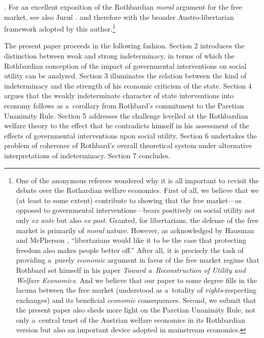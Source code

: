 {%
\parencites*[][]{rothbard_for_2006}[][]{rothbard_man_2009}[][]{rothbard_ethics_2002}. %
 For an excellent exposition of the Rothbardian \textit{moral} argument for the free market, see also Juruś 
\parencite*[][]{jurus_w_2012}. %
 } and therefore with the broader Austro-libertarian framework adopted by this author.\footnote{One of the anonymous referees wondered why it is all important to revisit the debate over the Rothardian welfare economics. First of all, we believe that we (at least to some extent) contribute to showing that the free market---as opposed to governmental interventions---bears positively on social utility not only \textit{ex ante} but also \textit{ex post}. Granted, for libertarians, the defense of the free market is primarily of \textit{moral} nature. However, as acknowledged by Hausman and McPherson 
\parencite*[][p.172]{hausman_economic_2006}, %
 ``libertarians would like it to be the case that protecting freedom also makes people better off.'' After all, it is precisely the task of providing a~purely \textit{economic} argument in favor of the free market regime that Rothbard set himself in his paper \textit{Toward a~Reconstruction of Utility and Welfare Economics}. And we believe that our paper to some degree fills in the lacuna between the free market (understood as a~totality of \textit{rights}{-respecting exchanges) and its beneficial }\textit{economic} consequences. Second, we submit that the present paper also sheds more light on the Paretian Unanimity Rule, not only a~central tenet of the Austrian welfare economics in its Rothbardian version but also an important device adopted in mainstream economics. }



The present paper proceeds in the following fashion. Section 2 introduces the distinction between weak and strong indeterminacy, in terms of which the Rothbardian conception of the impact of governmental interventions on social utility can be analyzed. Section 3 illuminates the relation between the kind of indeterminacy and the strength of his economic criticism of the state. Section 4 argues that the weakly indeterminate character of state interventions into economy follows as a~corollary from Rothbard's commitment to the Paretian Unanimity Rule. Section 5 addresses the challenge levelled at the Rothbardian welfare theory to the effect that he contradicts himself in his assessment of the effects of governmental interventions upon social utility. Section 6 undertakes the problem of coherence of Rothbard's overall theoretical system under alternative interpretations of indeterminacy. Section 7 concludes.



